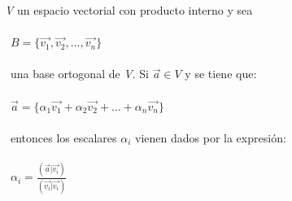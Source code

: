 \documentclass[preview]{standalone}
\begin{document}
\begin{center}
\justifyingSea \textit{V} un espacio vectorial con producto interno y sea \\\ \\\ $B = \{\vec{v_1}, \vec{v_2}, ..., \vec{v_n}\}$ \\\ \\\ una base ortogonal de \textit{V}. Si $\vec{a} \in V$ y se tiene que:\\\ \\\ $\vec{a} = \{\alpha_1 \vec{v_1} + \alpha_2 \vec{v_2} + ... + \alpha_n \vec{v_n} \}$ \\\ \\\ entonces los escalares $\alpha_i$ vienen dados por la expresión: \\\ \\\ $\alpha_i = \frac{(\vec{a} | \vec{v_i})}{(\vec{v_i} | \vec{v_i})} $
\end{center}
\end{document}
